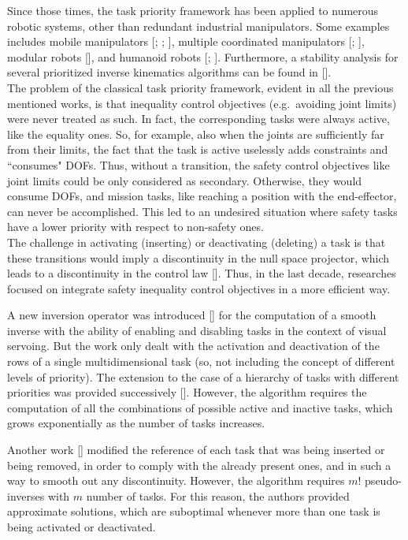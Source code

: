 Since those times, the task priority framework has been applied to numerous robotic systems, other than redundant industrial manipulators. Some examples includes mobile manipulators [\cite{IntroTpik12}; \cite{IntroTpik13}; \cite{IntroTpik14}], multiple coordinated manipulators [\cite{IntroTpik15}; \cite{IntroTpik16}], modular robots [\cite{IntroTpik17}], and humanoid robots [\cite{IntroTpik18}; \cite{IntroTpik19}]. Furthermore, a stability analysis for several prioritized inverse kinematics algorithms can be found in [\cite{IntroTpik20}].\\


The problem of the classical task priority framework, evident in all the previous mentioned works, is that inequality control objectives (e.g.\ avoiding
joint limits) were never treated as such. In fact, the corresponding tasks were always active, like the equality ones. So, for example, also when the joints are sufficiently far from their limits, the fact that the task is active uselessly adds constraints and ``consumes" DOFs.
Thus, without a transition, the safety control objectives like joint limits could be only considered as secondary. Otherwise, they would consume DOFs, and mission tasks, like reaching a position with the end-effector, can never be accomplished. This led to an undesired situation where safety tasks have a lower priority with respect to non-safety ones.\\


The challenge in activating (inserting) or deactivating (deleting) a task is that these transitions would imply a discontinuity in the null space projector, which leads to a discontinuity in the control law [\cite{IntroTpik21}]. Thus, in the last decade, researches focused on integrate safety inequality control objectives in a more efficient way. 

A new inversion operator was introduced [\cite{IntroTpik22}] for the computation of a smooth inverse with the ability of enabling and disabling tasks in the context of visual servoing. But the work only dealt with the activation and deactivation of the rows of a single multidimensional task (so, not including the concept of different levels of priority). The extension to the case of a hierarchy of tasks with different priorities was provided successively [\cite{IntroTpik23}]. However, the algorithm requires the computation of all the combinations of possible active and inactive tasks, which grows exponentially as the number of tasks increases.

Another work [\cite{IntroTpik21}] modified the reference of each task that was being inserted or being removed, in order to comply with the already present ones, and in such a way to smooth out any discontinuity. However, the algorithm requires $m!$ pseudo-inverses with $m$ number of tasks. For this reason, the authors provided approximate solutions, which are suboptimal whenever more than one task is being activated or deactivated.


